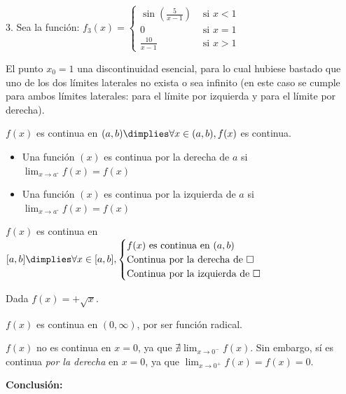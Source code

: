\begin{example}
3. Sea la función: $f_3(x)=\left\{\begin{matrix}\sin\left(\frac{5}{x-1}\right) & \mbox{ si } x<1 \\ 0 & \mbox{ si } x=1 \\ \frac{10}{x-1}& \mbox{ si } x>1\end{matrix}\right.$

El punto $x_0=1$  una discontinuidad esencial, para lo cual hubiese bastado que uno de los dos límites laterales no exista o sea infinito (en este caso se cumple para ambos límites laterales: para el límite por izquierda y para el límite por derecha).
\end{example}

\begin{defn}

	$f(x)$ es continua en $(a,b) \dimplies \forall x\in(a,b), f(x)$ es continua.
\end{defn}


\begin{defn}
	\begin{itemize}
		\item Una función $(x)$ es continua por la derecha de $a$ si $\displaystyle\lim_{x\to a^\square}f(x) = f(x)$
		\item Una función $(x)$ es continua por la izquierda de $a$ si $\displaystyle\lim_{x\to a^\square} f(x) = f(x)$
	\end{itemize}
\end{defn}

\begin{defn}

$f(x)$ es continua en $[a,b] \dimplies \forall x\in[a,b],\begin{cases} f(x) \text{ es continua en } (a,b)\\
\text{Continua por la derecha de } \square\\
\text{Continua por la izquierda de } \square\\\end{cases}$
\end{defn}
\vspace{-0.5cm}

\begin{example}
Dada $f(x) = +\sqrt{x}$.

$f(x)$ es continua en $(0,\infty)$, por ser función radical. 

$f(x)$ no es continua en $x=0$, ya que $\nexists\displaystyle\lim_{x\to 0^-}f(x)$. 
%
Sin embargo, sí es continua \textit{por la derecha} en $x=0$, ya que $\displaystyle\lim_{x\to 0^+} f(x) = f(x) = 0$. 

\textbf{Conclusión:}
\end{example}

